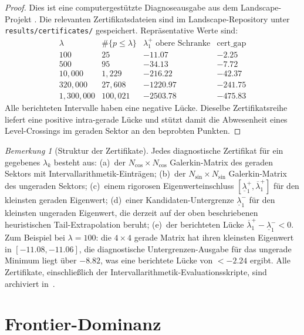 \documentclass[11pt,a4paper]{article}
\theoremstyle{remark}
\newtheorem{remark}[remark]{Bemerkung}
\theoremstyle{plain}
\begin{document}
\begin{proof}
Dies ist eine computergestützte Diagnoseausgabe aus dem Landscape-Projekt \cite{GeigerLandscapeII}. Die relevanten Zertifikatsdateien sind im Landscape-Repository unter \texttt{results/certificates/} gespeichert. Repräsentative Werte sind:
\[
\begin{array}{r|r|r|r}
\lambda & \#\{p\leq\lambda\} & \lambda_1^+ \text{ obere Schranke} &
\mathrm{cert\_gap}\\\hline
100 & 25 & -11.07 & -2.25\\
500 & 95 & -34.13 & -7.72\\
10{,}000 & 1{,}229 & -216.22 & -42.37\\
320{,}000 & 27{,}608 & -1220.97 & -241.75\\
1{,}300{,}000 & 100{,}021 & -2503.78 & -475.83
\end{array}
\]
Alle berichteten Intervalle haben eine negative Lücke. Dieselbe Zertifikatsreihe liefert eine positive intra-gerade Lücke und stützt damit die Abwesenheit eines Level-Crossings im geraden Sektor an den beprobten Punkten.
\end{proof}

\begin{remark}[Struktur der Zertifikate]
\label{rem:cert-structure}
Jedes diagnostische Zertifikat für ein gegebenes $\lambda_k$ besteht aus:
(a)~der $N_{\cos}\times N_{\cos}$ Galerkin-Matrix des geraden Sektors mit Intervallarithmetik-Einträgen;
(b)~der $N_{\sin}\times N_{\sin}$ Galerkin-Matrix des ungeraden Sektors;
(c)~einem rigorosen Eigenwerteinschluss $[\underline\lambda_1^+,\overline\lambda_1^+]$ für den kleinsten geraden Eigenwert;
(d)~einer Kandidaten-Untergrenze $\underline\lambda_1^-$ für den kleinsten ungeraden Eigenwert, die derzeit auf der oben beschriebenen heuristischen Tail-Extrapolation beruht;
(e)~der berichteten Lücke $\overline\lambda_1^+-\underline\lambda_1^-<0$.
Zum Beispiel bei $\lambda=100$: die $4\times 4$ gerade Matrix hat ihren kleinsten Eigenwert in $[-11.08,-11.06]$, die diagnostische Untergrenzen-Ausgabe für das ungerade Minimum liegt über $-8.82$, was eine berichtete Lücke von $<-2.24$ ergibt. Alle Zertifikate, einschließlich der Intervallarithmetik-Evaluationsskripte, sind archiviert in~\cite{GeigerLandscapeII}.
\end{remark}

\section{Frontier-Dominanz}
\label{sec:frontier}
\end{document}
